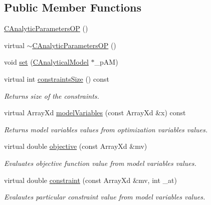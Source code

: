 \subsection*{Public Member Functions}
\begin{DoxyCompactItemize}
\item 
\hyperlink{class_go_s_u_m_1_1_c_analytic_parameters_o_p_ad270573ddaf4ab73765fcb7504bc9c55}{C\-Analytic\-Parameters\-O\-P} ()
\item 
virtual \hyperlink{class_go_s_u_m_1_1_c_analytic_parameters_o_p_aebb38b9095286a66faad9c6236a083a0}{$\sim$\-C\-Analytic\-Parameters\-O\-P} ()
\item 
void \hyperlink{class_go_s_u_m_1_1_c_analytic_parameters_o_p_ae2f594844357a550fa54ccc196476ccd}{set} (\hyperlink{class_go_s_u_m_1_1_c_analytical_model}{C\-Analytical\-Model} $\ast$\-\_\-p\-A\-M)
\item 
virtual int \hyperlink{class_go_s_u_m_1_1_c_analytic_parameters_o_p_a002dbbbcaa4d96be44e2d7013ba0969c}{constraints\-Size} () const 
\begin{DoxyCompactList}\small\item\em Returns size of the constraints. \end{DoxyCompactList}\item 
virtual Array\-Xd \hyperlink{class_go_s_u_m_1_1_c_analytic_parameters_o_p_a161714b73d17a92593e379f96111d5bc}{model\-Variables} (const Array\-Xd \&x) const 
\begin{DoxyCompactList}\small\item\em Returns model variables values from optimization variables values. \end{DoxyCompactList}\item 
virtual double \hyperlink{class_go_s_u_m_1_1_c_analytic_parameters_o_p_a6323299ee9312bcabd43e25e78479201}{objective} (const Array\-Xd \&mv)
\begin{DoxyCompactList}\small\item\em Evaluates objective function value from model variables values. \end{DoxyCompactList}\item 
virtual double \hyperlink{class_go_s_u_m_1_1_c_analytic_parameters_o_p_a98e176ce9296644e0a9a98bbd22811e8}{constraint} (const Array\-Xd \&mv, int \-\_\-at)
\begin{DoxyCompactList}\small\item\em Evalautes particular constraint value from model variables values. \end{DoxyCompactList}\end{DoxyCompactItemize}
